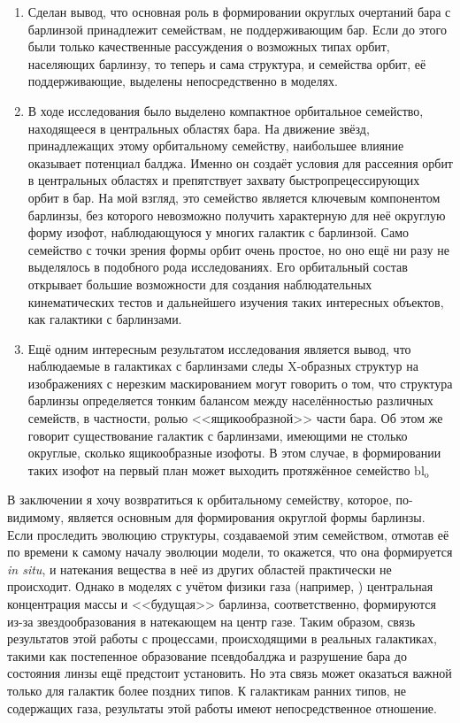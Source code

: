 \documentclass{trlnotes}
\begin{document}
\begin{enumerate}
  \item  Сделан вывод, что основная роль в формировании округлых очертаний бара с барлинзой принадлежит семействам, не поддерживающим бар. Если до этого были только качественные рассуждения о возможных типах орбит, населяющих барлинзу, то теперь и сама структура, и семейства орбит, её поддерживающие, выделены непосредственно в моделях.
  \item В ходе исследования было выделено компактное орбитальное семейство, находящееся в центральных областях бара.  На движение звёзд, принадлежащих этому орбитальному семейству, наибольшее влияние оказывает потенциал балджа. Именно он создаёт условия для рассеяния орбит в центральных областях и препятствует захвату быстропрецессирующих орбит в бар. На мой взгляд, это семейство является ключевым компонентом барлинзы, без
которого невозможно получить характерную для неё округлую форму изофот, наблюдающуюся у многих галактик с барлинзой. Само семейство с точки зрения формы орбит очень простое, но оно ещё ни разу не выделялось в подобного рода исследованиях. Его орбитальный состав открывает большие возможности для создания наблюдательных кинематических тестов и дальнейшего изучения таких интересных объектов, как галактики с барлинзами.
  \item  Ещё одним интересным результатом исследования является вывод, что наблюдаемые в галактиках с барлинзами следы X-образных структур на
    изображениях с нерезким маскированием могут говорить о том, что структура барлинзы определяется тонким балансом между населённостью различных
    семейств, в частности, ролью <<ящикообразной>> части бара. Об этом же говорит существование галактик с барлинзами, имеющими не столько
    округлые, сколько ящикообразные изофоты. В этом случае, в формировании таких изофот на первый план может выходить протяжённое семейство $\text{bl}_{\text{o}}$
\end{enumerate}
В заключении я хочу возвратиться к орбитальному семейству, которое, по-видимому, является основным для формирования округлой формы барлинзы. 
Если проследить эволюцию структуры, создаваемой этим семейством, отмотав её по времени к самому началу эволюции модели, то окажется, что она
формируется \emph{in situ}, и натекания вещества в неё из других областей практически не происходит. Однако в моделях с учётом физики газа (например, \cite{athanassoula2015}) центральная концентрация массы и <<будущая>> барлинза, соответственно, формируются из-за 
звездообразования в натекающем на центр газе. Таким образом, связь результатов этой работы с процессами, происходящими в реальных галактиках, такими
как постепенное образование псевдобалджа и разрушение бара до состояния линзы \citep{combes2011} ещё предстоит установить. Но эта связь может
оказаться важной только для галактик более поздних типов. К галактикам ранних типов, не содержащих газа, результаты этой работы имеют
непосредственное отношение.
 
\end{document}
